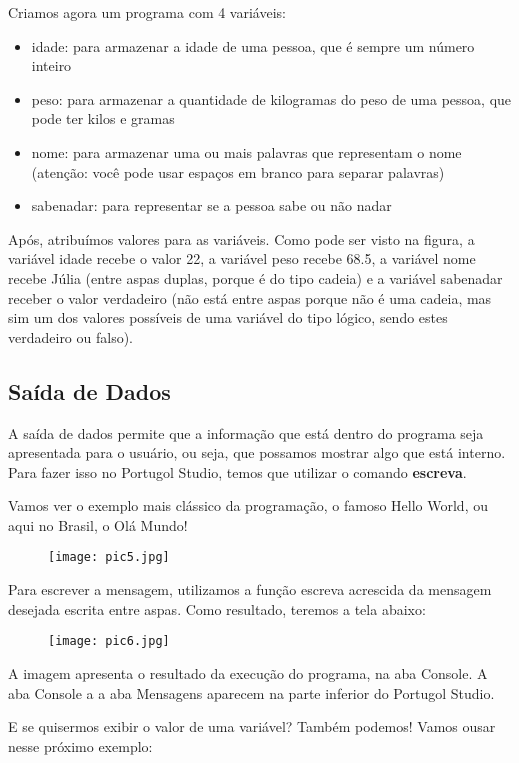 \documentclass{article}
\begin{document}
Criamos agora um programa com 4 variáveis:

\begin{itemize}
    \item idade: para armazenar a idade de uma pessoa, que é sempre um número inteiro
    \item peso: para armazenar a quantidade de kilogramas do peso de uma pessoa, que pode ter kilos e gramas
    \item nome: para armazenar uma ou mais palavras que representam o nome (atenção: você pode usar espaços em branco para separar palavras)
    \item sabenadar: para representar se a pessoa sabe ou não nadar
\end{itemize}
Após, atribuímos valores para as variáveis. Como pode ser visto na figura, a variável idade recebe o valor 22, a variável peso recebe 68.5, a variável nome recebe Júlia (entre aspas duplas, porque é do tipo cadeia) e a variável sabenadar receber o valor verdadeiro (não está entre aspas porque não é uma cadeia, mas sim um dos valores possíveis de uma variável do tipo lógico, sendo estes verdadeiro ou falso).

\subsection{Saída de Dados}
A saída de dados permite que a informação que está dentro do programa seja apresentada para o usuário, ou seja, que possamos mostrar algo que está interno. Para fazer isso no Portugol Studio, temos que utilizar o comando \textbf{escreva}.

Vamos ver o exemplo mais clássico da programação, o famoso Hello World, ou aqui no Brasil, o Olá Mundo!

\begin{figure}[H]
    \centering
    \texttt{[image: pic5.jpg]}
    \label{fig:pic5}
\end{figure}
Para escrever a mensagem, utilizamos a função escreva acrescida da mensagem desejada escrita entre aspas. Como resultado, teremos a tela abaixo:

\begin{figure}[H]
    \centering
    \texttt{[image: pic6.jpg]}
    \label{fig:pic6}
\end{figure}
A imagem apresenta o resultado da execução do programa, na aba Console. A aba Console a a aba Mensagens aparecem na parte inferior do Portugol Studio.

E se quisermos exibir o valor de uma variável? Também podemos! Vamos ousar nesse próximo exemplo:
\end{document}
